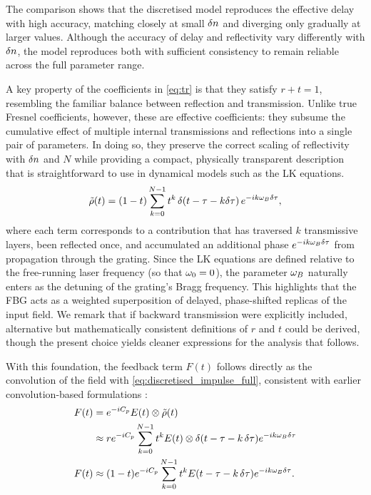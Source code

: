 The comparison shows that the discretised model reproduces the effective delay with high accuracy, matching closely at small $\delta n$ and diverging only gradually at larger values.
Although the accuracy of delay and reflectivity vary differently with $\delta n$, the model reproduces both with sufficient consistency to remain reliable across the full parameter range.
%
\par
%
A key property of the coefficients in \eqref{eq:tr} is that they satisfy $r+t=1$, resembling the familiar balance between reflection and transmission. 
Unlike true Fresnel coefficients, however, these are effective coefficients: they subsume the cumulative effect of multiple internal transmissions and reflections into a single pair of parameters. 
In doing so, they preserve the correct scaling of reflectivity with $\delta n$ and $N$ while providing a compact, physically transparent description that is straightforward to use in dynamical models such as the LK equations. 
%
\begin{equation}
    \label{eq:discretised_impulse_full}
    \tilde{\rho}(t) = (1-t)\sum_{k=0}^{N-1} t^k \, \delta(t-\tau-k\delta \tau)\, e^{-i k \omega_B \delta \tau},
\end{equation}
%
where each term corresponds to a contribution that has traversed $k$ transmissive layers, been reflected once, and accumulated an additional phase $e^{-i k \omega_B \delta \tau}$ from propagation through the grating. 
Since the LK equations are defined relative to the free-running laser frequency (so that $\omega_0=0$), the parameter $\omega_B$ naturally enters as the detuning of the grating's Bragg frequency. 
This highlights that the FBG acts as a weighted superposition of delayed, phase-shifted replicas of the input field. 
We remark that if backward transmission were explicitly included, alternative but mathematically consistent definitions of $r$ and $t$ could be derived, though the present choice yields cleaner expressions for the analysis that follows.
%
\par
%
With this foundation, the feedback term $F(t)$ follows directly as the convolution of the field with \eqref{eq:discretised_impulse_full}, consistent with earlier convolution-based formulations \cite{skenderas2024impact,skenderas2021feedback,li2012distributed,li2015chaotic,li2020stable}:
%
\begin{align*}
F(t) &= e^{-i C_p} E(t) \otimes \tilde{\rho}(t) \\
&\approx r e^{-i C_p} \sum_{k=0}^{N-1} t^k E(t) \otimes \delta(t-\tau-k\,\delta \tau) e^{-i k \omega_B \delta \tau} \\
F(t) &\approx (1-t) e^{-i C_p} \sum_{k=0}^{N-1} t^k E(t-\tau-k\,\delta \tau) e^{-i k \omega_B \delta \tau}.
\end{align*}
